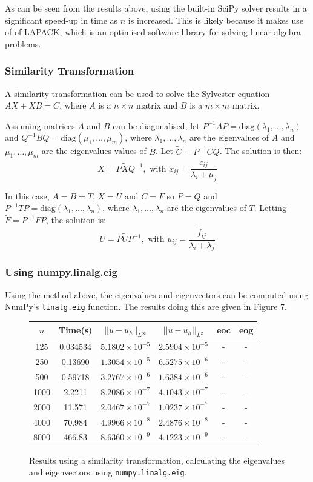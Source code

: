 \documentclass{article}
\numberwithin{equation}{section}
\begin{document}
As can be seen from the results above, using the built-in SciPy solver results in a significant speed-up in time as $n$ is increased. This is likely because it makes use of of LAPACK, which is an optimised software library for solving linear algebra problems.


\subsubsection{Similarity Transformation}
A similarity transformation \cite{Simoncini} can be used to solve the Sylvester equation $AX + XB = C$, where $A$ is a $n \times n$ matrix and $B$ is a $m \times m$ matrix. 

Assuming matrices $A$ and $B$ can be diagonalised, let $P^{-1}AP = \text{diag}(\lambda_1, \dots, \lambda_n)$ and $Q^{-1}BQ = \text{diag}(\mu_1, \dots, \mu_m)$, where $\lambda_1, \dots, \lambda_n$ are the eigenvalues of $A$ and $\mu_1, \dots, \mu_m$ are the eigenvalues values of $B$. Let $\tilde{C} = P^{-1}CQ$. The solution is then:
\[ X = P \tilde{X} Q^{-1}, \text{ with } \tilde{x}_{ij} = \frac{\tilde{c}_{ij}}{\lambda_i + \mu_j} \]

In this case, $A=B=T$, $X=U$ and $C=F$ so $P=Q$ and $P^{-1}TP = \text{diag}(\lambda_1, \dots, \lambda_n)$, where $\lambda_1, \dots, \lambda_n$ are the eigenvalues of $T$. Letting $\tilde{F}=P^{-1}FP$, the solution is:
\[ U = P \tilde{U} P^{-1}, \text{ with } \tilde{u}_{ij} = \frac{\tilde{f}_{ij}}{\lambda_i + \lambda_j} \]

\subsubsection*{Using numpy.linalg.eig}
Using the method above, the eigenvalues and eigenvectors can be computed using NumPy's \texttt{linalg.eig} function. The results doing this are given in Figure 7.

\begin{figure}[H]
\centering
\begin{tabular}{|c|c|c|c|c|c|}
\hline
$n$ & Time(s) & $|| u - u_h ||_{L^{\infty}}$ &$|| u - u_h ||_{L^{2}}$ & eoc & eog \\
\hline
125 & 0.034534 & $5.1802 \times 10^{-5}$ & $2.5904 \times 10^{-5}$ & -  & - \\
250 & 0.13690 & $1.3054 \times 10^{-5}$ & $6.5275 \times 10^{-6}$ & - & -  \\
500 & 0.59718 & $3.2767 \times 10^{-6}$ & $1.6384 \times 10^{-6}$ & - & -  \\
1000 & 2.2211 & $8.2086 \times 10^{-7}$ & $4.1043 \times 10^{-7}$ & - & -  \\
2000 & 11.571 & $2.0467 \times 10^{-7}$ & $1.0237 \times 10^{-7}$ & - & -  \\
4000 & 70.984 & $4.9966 \times 10^{-8}$ & $2.4876 \times 10^{-8}$ & - & -  \\
8000 & 466.83 & $8.6360 \times 10^{-9}$ & $4.1223 \times 10^{-9}$ & - & -  \\
\hline
\end{tabular}
\captionsetup{justification=centering}
\caption{Results using a similarity transformation, calculating the eigenvalues and eigenvectors using \texttt{numpy.linalg.eig}.}
\end{figure}
\end{document}
